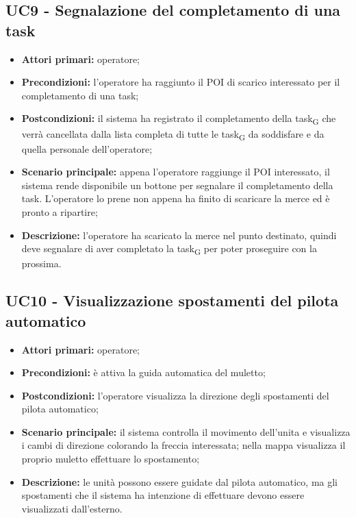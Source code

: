 \subsection{UC9 - Segnalazione del completamento di una task}
\begin{itemize}
	\item 	\textbf{Attori primari:} operatore;
	\item 	\textbf{Precondizioni:} l'operatore ha raggiunto il POI di scarico interessato per il completamento di una task;
	\item 	\textbf{Postcondizioni:} il sistema ha registrato il completamento della task\textsubscript{G} che verrà cancellata dalla lista completa di tutte le task\textsubscript{G} da soddisfare e da quella personale dell'operatore;
	\item 	\textbf{Scenario principale:} appena l'operatore raggiunge il POI interessato, il sistema rende disponibile un bottone per segnalare il completamento della task. L'operatore lo prene non appena ha finito di scaricare la merce ed è pronto a ripartire;
	\item 	\textbf{Descrizione:} l'operatore ha scaricato la merce nel punto destinato, quindi deve segnalare di aver completato la task\textsubscript{G} per poter proseguire con la prossima.

\end{itemize}

\subsection{UC10 - Visualizzazione spostamenti del pilota automatico}
\begin{itemize}
	\item 	\textbf{Attori primari:} operatore;
	\item 	\textbf{Precondizioni:} è attiva la guida automatica del muletto;
	\item 	\textbf{Postcondizioni:} l'operatore visualizza la direzione degli spostamenti del pilota automatico;
	\item 	\textbf{Scenario principale:} il sistema controlla il movimento dell'unita e visualizza i cambi di direzione colorando la freccia interessata; nella mappa visualizza il proprio muletto effettuare lo spostamento;
	\item 	\textbf{Descrizione:} le unità possono essere guidate dal pilota automatico, ma gli spostamenti che il sistema ha intenzione di effettuare devono essere visualizzati dall'esterno.

\end{itemize}
 
